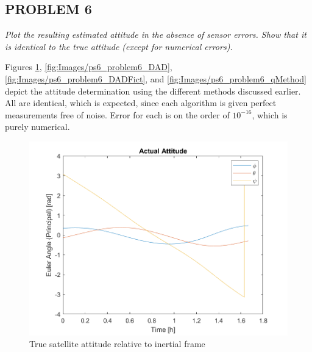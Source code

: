 





\subsection{PROBLEM 6}
\textit{Plot the resulting estimated attitude in the absence of sensor errors. Show that it is identical to the true attitude (except for numerical errors).}

Figures \ref{fig:Images/ps6_problem6_actual}, \ref{fig:Images/ps6_problem6_DAD}, \ref{fig:Images/ps6_problem6_DADFict}, and \ref{fig:Images/ps6_problem6_qMethod} depict the attitude determination using the different methods discussed earlier. All are identical, which is expected, since each algorithm is given perfect measurements free of noise. Error for each is on the order of $10^{-16}$, which is purely numerical.

\begin{figure}[H]
\centering
\includegraphics[scale=0.8]{Images/ps6_problem6_actual.png}
\caption{True satellite attitude relative to inertial frame}
\label{fig:Images/ps6_problem6_actual}
\end{figure}

